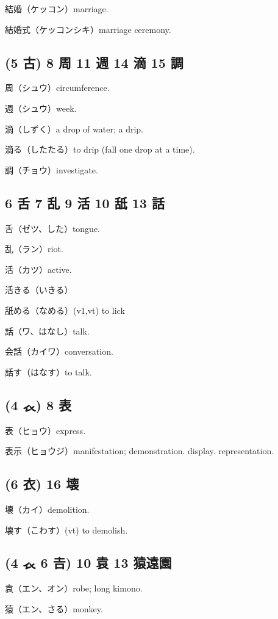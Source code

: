 結婚（ケッコン）marriage.

結婚式（ケッコンシキ）marriage ceremony.

\subsection{(5 古) 8 周 11 週 14 滴 15 調}

周（シュウ）circumference.

週（シュウ）week.

滴（しずく）a drop of water; a drip.

滴る（したたる）to drip (fall one drop at a time).

調（チョウ）investigate.

\subsection{6 舌 7 乱 9 活 10 舐 13 話}

舌（ゼツ、した）tongue.

乱（ラン）riot.

活（カツ）active.

活きる（いきる）

舐める（なめる）(v1,vt) to lick

話（ワ、はなし）talk.

会話（カイワ）conversation.

話す（はなす）to talk.

\subsection{(4 𧘇) 8 表}

表（ヒョウ）express.

表示（ヒョウジ）manifestation; demonstration. display. representation.

\subsection{(6 衣) 16 壊}

壊（カイ）demolition.

壊す（こわす）(vt) to demolish.

\subsection{(4 𧘇 6 𠮷) 10 袁 13 猿遠園}

袁（エン、オン）robe; long kimono.

猿（エン、さる）monkey.

